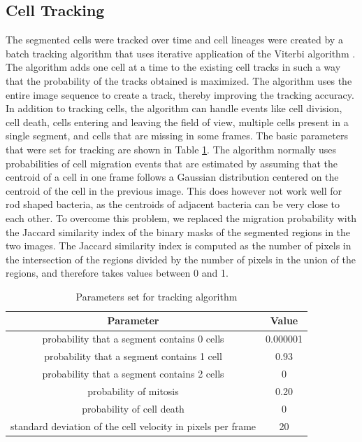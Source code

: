 \documentclass[journal]{IEEEtran}
\begin{document}
\subsection{Cell Tracking}

The segmented cells were tracked over time and cell lineages were created by a batch tracking algorithm that uses iterative application of the Viterbi algorithm \cite {magnussonglobal2014}. The algorithm adds one cell at a time to the existing cell tracks in such a way that the probability of the tracks obtained is maximized. The algorithm uses the entire image sequence to create a track, thereby improving the tracking accuracy. In addition to tracking cells, the algorithm can handle events like cell division, cell death, cells entering and leaving the field of view, multiple cells present in a single segment, and cells that are missing in some frames. The basic parameters that were set for tracking are shown in Table \ref{tab:paramtrack}. The algorithm normally uses probabilities of cell migration events that are estimated by assuming that the centroid of a cell in one frame follows a Gaussian distribution centered on the centroid of the cell in the previous image. This does however not work well for rod shaped bacteria, as the centroids of adjacent bacteria can be very close to each other. To overcome this problem, we replaced the migration probability with the Jaccard similarity index of the binary masks of the segmented regions in the two images. The Jaccard similarity index is computed as the number of pixels in the intersection of the regions divided by the number of pixels in the union of the regions, and therefore takes values between 0 and 1.

\begin{table}[t]
	\caption{Parameters set for tracking algorithm}
	\label{tab:paramtrack}
	\centering
	
	\begin{tabular}{c c }
		\hline
		\hline
		Parameter & Value \\
		\hline
		probability that a segment contains 0 cells & 0.000001\\
		probability that a segment contains 1 cell & 0.93 \\
		probability that a segment contains 2 cells & 0 \\
		probability of mitosis & 0.20\\
		probability of cell death & 0 \\
		standard deviation of the cell velocity in pixels per frame & 20\\
		\hline
		\hline
	\end{tabular}
	
\end{table}
\end{document}
